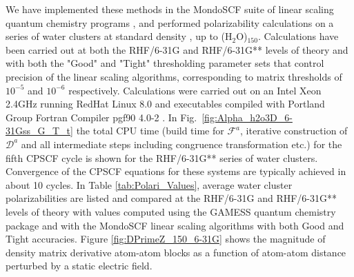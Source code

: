 \documentclass[prl,aps,twocolumn,showpacs,twocolumngrid,superbib]{revtex4}
\begin{document}
We have implemented these methods in the MondoSCF suite of linear scaling quantum chemistry programs \cite{},
and performed polarizability calculations on a series of water clusters at standard density \cite{Water}, 
up to (H$_2$O)$_{150}$. Calculations have been carried out at both the RHF/6-31G and RHF/6-31G** levels of 
theory and with both the "Good" and "Tight" thresholding parameter sets that control precision of the 
linear scaling algorithms, corresponding to matrix thresholds of $10^{-5}$ and $10^{-6}$ respectively.  
Calculations were carried out on an Intel Xeon 2.4GHz running RedHat Linux 8.0 and  executables compiled 
with Portland Group Fortran Compiler pgf90 4.0-2 \cite{PGF90}.  In Fig.~\ref{fig:Alpha_h2o3D_6-31Gss_G_T_t} the 
total CPU time (build time for $\mathcal{F}^a$, iterative construction of $\mathcal{D}^a$ and all intermediate 
steps including congruence transformation etc.) for the fifth CPSCF cycle is shown for the RHF/6-31G** series 
of water clusters.  Convergence of the CPSCF equations for these systems are typically achieved in about 10 cycles.  
In Table \ref{tab:Polari_Values},  average water cluster  polarizabilities are listed and compared at the RHF/6-31G 
and RHF/6-31G** levels of theory with values computed using the GAMESS quantum chemistry package \cite{gamess} and 
with the MondoSCF linear scaling algorithms with both Good and Tight accuracies.  Figure \ref{fig:DPrimeZ_150_6-31G} 
shows the magnitude of density matrix derivative atom-atom blocks as a function of atom-atom distance perturbed 
by a static electric field.
\end{document}
